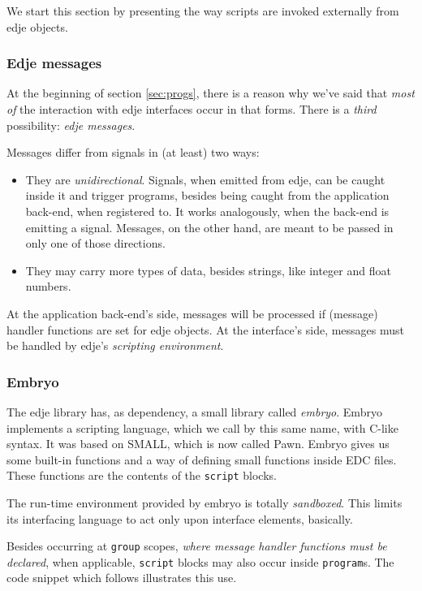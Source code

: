 \documentclass[a4paper]{profusion}
\begin{document}
We start this section by presenting the way scripts are invoked
externally from edje objects.

\subsubsection{Edje messages}

At the beginning of section \ref{sec:progs}, there is a reason why
we've said that \emph{most of} the interaction with edje interfaces
occur in that forms. There is a \emph{third} possibility: \emph{edje
  messages}.

Messages differ from signals in (at least) two ways:
\begin{itemize}
\item They are \emph{unidirectional}. Signals, when emitted from edje,
  can be caught inside it and trigger programs, besides being caught
  from the application back-end, when registered to. It works
  analogously, when the back-end is emitting a signal. Messages, on
  the other hand, are meant to be passed in only one of those
  directions.
\item They may carry more types of data, besides strings, like integer
  and float numbers.
\end{itemize}

At the application back-end's side, messages will be processed if
(message) handler functions are set for edje objects. At the
interface's side, messages must be handled by edje's \emph{scripting
  environment}.

\subsubsection{Embryo}

The edje library has, as dependency, a small library called
\emph{embryo}. Embryo implements a scripting language, which we call
by this same name, with C-like syntax. It was based on SMALL, which is
now called Pawn. Embryo gives us some built-in functions and a way of
defining small functions inside EDC files. These functions are the
contents of the \texttt{script} blocks.

The run-time environment provided by embryo is totally
\emph{sandboxed}. This limits its interfacing language to act only
upon interface elements, basically.

Besides occurring at \texttt{group} scopes, \emph{where message handler
  functions must be declared}, when applicable, \texttt{script} blocks
may also occur inside \texttt{program}s. The code snippet which
follows illustrates this use.
\end{document}
